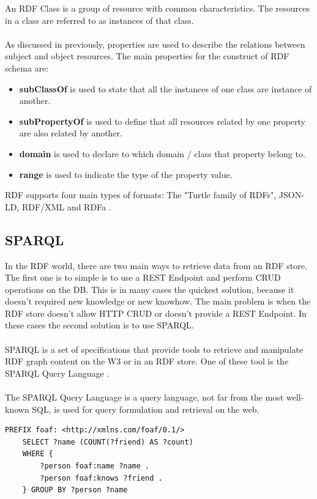 An RDF Class is a group of resource with common characteristics. The resources in a class are referred to as instances of that class.
\\
\\
As discussed in previously, properties are used to describe the relations between subject and object resources.
The main properties for the construct of RDF schema are: 
\begin{itemize}
	\item \textbf{subClassOf} is used to state that all the instances of one class are instance of another.
	\item \textbf{subPropertyOf} is used to define that all resources related by one property are also related by another.
	\item \textbf{domain} is used to declare to which domain / class that property belong to.
	\item \textbf{range} is used to indicate the type of the property value.
\end{itemize}

RDF supports four main types of formats: The "Turtle family of RDFs", JSON-LD, RDF/XML and RDFa \cite{rdf}.



\subsection{SPARQL \label{sec:bbb}}
In the RDF world, there are two main ways to retrieve data from an RDF store. The first one is to simple is to use a REST Endpoint and perform CRUD operations on the DB. This is in many cases the quickest solution, because it doesn't required new knowledge or new knowhow. 
The main problem is when the RDF store doesn't allow HTTP CRUD or doesn't provide a REST Endpoint.
In these cases the second solution is to use SPARQL.
\\
\\
SPARQL is a set of specifications that provide tools to retrieve and manipulate RDF graph content on the W3 or in an RDF store.
One of these tool is the SPARQL Query Language \cite{sparql}.
\\
\\
The SPARQL Query Language is a query language, not far from the most well-known SQL, is used for query formulation and retrieval on the web.
\begin{lstlisting}[language=SPARQL, caption={Example of SPARQL Query}, basicstyle=\ttfamily, frame=single]
    PREFIX foaf: <http://xmlns.com/foaf/0.1/>
    SELECT ?name (COUNT(?friend) AS ?count)
    WHERE { 
        ?person foaf:name ?name . 
        ?person foaf:knows ?friend . 
    } GROUP BY ?person ?name
\end{lstlisting}

